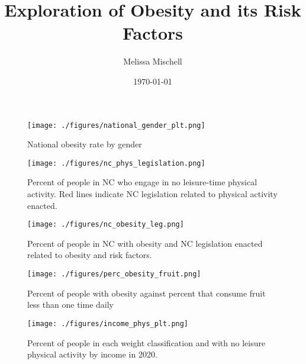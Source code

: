 \documentclass[11pt]{article}
\title{Exploration of Obesity and its Risk Factors}
\author{Melissa Mischell}
\date{\today}
\begin{document}
\maketitle

\begin{figure}[h]
\texttt{[image: ./figures/national\_gender\_plt.png]}
\caption{National obesity rate by gender}
\label{fig:gender}
\end{figure}

\begin{figure}[h]
\texttt{[image: ./figures/nc\_phys\_legislation.png]}
\caption{
  Percent of people in NC who engage in no leisure-time physical activity. 
  Red lines indicate NC legislation related to physical activity enacted.
}
\label{fig:phys_act}
\end{figure}

\begin{figure}[h]
\texttt{[image: ./figures/nc\_obesity\_leg.png]}
\caption{
  Percent of people in NC with obesity and NC legislation enacted related to obesity and risk factors. 
}
\label{fig:nc_obesity}
\end{figure}


\begin{figure}[h]
\texttt{[image: ./figures/perc\_obesity\_fruit.png]}
\caption{
  Percent of people with obesity against percent that consume fruit less than one time daily
}
\label{fig:obesity_fruit}
\end{figure}

\begin{figure}[h]
\texttt{[image: ./figures/income\_phys\_plt.png]}
\caption{
  Percent of people in each weight classification and with no leisure physical activity by income in 2020.
}
\label{fig:income_pa}
\end{figure}
\end{document}
